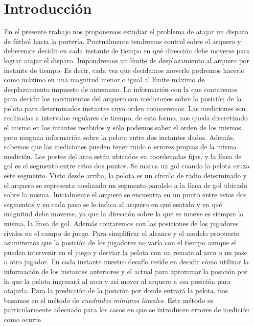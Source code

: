 \section{Introducción}

En el presente trabajo nos proponemos estudiar el problema de atajar un disparo de fútbol hacia la portería. Puntualmente tendremos control
sobre el arquero y deberemos decidir en cada instante de tiempo en qué dirección debe moverse para lograr atajar el disparo. 
Impondremos un límite de desplazamiento al arquero por instante de tiempo. Es decir, cada vez que decidamos moverlo podremos hacerlo
como máximo en una magnitud menor o igual al límite máximo de desplazamiento impuesto de antemano.
La información con la que contaremos para decidir los movimientos del arquero son mediciones sobre la posición de la pelota para determinados
instantes cuyo orden conoceremos. Las mediciones son realizadas a intervalos regulares de tiempo, de esta forma, nos queda discretizado el mismo en los intantes 
recibidos y sólo podemos saber el orden de los mismos pero ninguna información sobre la pelota entre dos instantes dados. Además, sabemos
que las mediciones pueden tener ruido o errores propias de la misma medición.
Los postes del arco están ubicados en coordenadas fijas, y la línea de gol es el segmento entre estos dos puntos.
Se marca un gol cuando la pelota cruza este segmento. Visto desde arriba, la pelota es un círculo de radio
determinado y el arquero se representa mediando un segmento paralelo a la línea de gol ubicado sobre la misma.
Inicialmente el arquero se encuentra en un punto entre estos dos segmentos y en cada paso se le indica al arquero
en qué sentido y en qué magnitud debe moverse, ya que la dirección sobre la que se mueve es siempre la misma, la 
línea de gol.
Además contaremos con las posiciones de los jugadores rivales en el campo de juego. Para simplificar el alcance y
el modelo propuesto asumiremos que la posición de los jugadores no varía con el tiempo aunque sí pueden intervenir
en el juego y desviar la pelota con un remate al arco o un pase a otro jugador.
En cada instante nuestro desafío reside en decidir cómo utilizar la información de los instantes anteriores y el actual para aproximar 
la posición por la que la pelota ingresará al arco y así mover al arquero a esa posición para atajarla. Para la predicción de la 
posición por donde entrará la pelota, nos basamos en el método de \emph{cuadrados mínimos lineales}. 
Este método es particularmente adecuado para los casos en que se introducen errores de medición\cite[\emph{3.2}]{heath} como ocurre 
